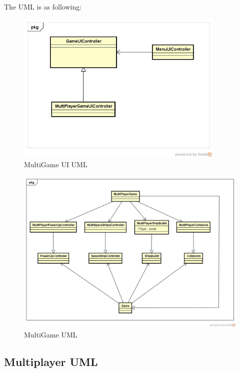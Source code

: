 \documentclass[10pt]{article}
\begin{document}
The UML is as following:
\begin{figure}[ht!]
	\centering
	\includegraphics[width=10cm]{GameUI.jpg}
	\caption{MultiGame UI UML}
	\label{fig:1-1MultiGameUI}
\end{figure}
\begin{figure}[ht!]
	\centering
	\includegraphics[width=15cm]{MultiGame.jpg}
	\caption{MultiGame UML}
	\label{fig:1-1MultiGameGame}
\end{figure}

\subsection{Multiplayer UML}
\end{document}

